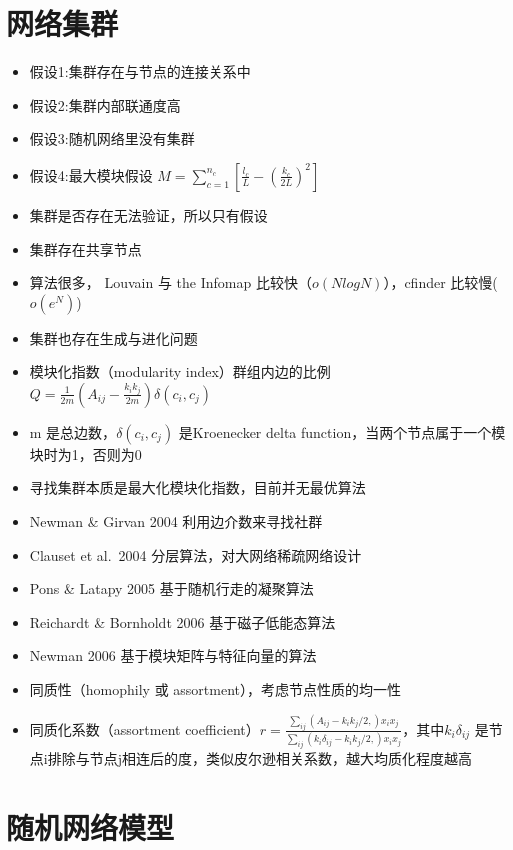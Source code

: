\documentclass[
]{book}
\providecommand{\tightlist}{%
  \setlength{\itemsep}{0pt}\setlength{\parskip}{0pt}}
\begin{document}
\hypertarget{ux7f51ux7edcux96c6ux7fa4}{%
\section{网络集群}\label{ux7f51ux7edcux96c6ux7fa4}}

\begin{itemize}
\tightlist
\item
  假设1:集群存在与节点的连接关系中
\item
  假设2:集群内部联通度高
\item
  假设3:随机网络里没有集群
\item
  假设4:最大模块假设 \(M=\sum_{c=1}^{n_c}[\frac{l_c}{L}-(\frac{k_c}{2L})^2]\)
\item
  集群是否存在无法验证，所以只有假设
\item
  集群存在共享节点
\item
  算法很多， Louvain 与 the Infomap 比较快（\(o(NlogN)\)），cfinder 比较慢(\(o(e^N)\))
\item
  集群也存在生成与进化问题
\item
  模块化指数（modularity index）群组内边的比例 \(Q = \frac{1}{2m}(A_{ij}-\frac{k_ik_j}{2m})\delta(c_i,c_j)\)
\item
  m 是总边数，\(\delta(c_i,c_j)\) 是Kroenecker delta function，当两个节点属于一个模块时为1，否则为0
\item
  寻找集群本质是最大化模块化指数，目前并无最优算法
\item
  Newman \& Girvan 2004 利用边介数来寻找社群
\item
  Clauset et al.~2004 分层算法，对大网络稀疏网络设计
\item
  Pons \& Latapy 2005 基于随机行走的凝聚算法
\item
  Reichardt \& Bornholdt 2006 基于磁子低能态算法
\item
  Newman 2006 基于模块矩阵与特征向量的算法
\item
  同质性（homophily 或 assortment），考虑节点性质的均一性
\item
  同质化系数（assortment coefficient）\(r=\frac{\sum_{ij}(A_{ij}-k_ik_j/2,)x_ix_j}{\sum_{ij}(k_i\delta_{ij}-k_ik_j/2,)x_ix_j}\)，其中\(k_i\delta_{ij}\) 是节点i排除与节点j相连后的度，类似皮尔逊相关系数，越大均质化程度越高
\end{itemize}

\hypertarget{ux968fux673aux7f51ux7edcux6a21ux578b}{%
\section{随机网络模型}\label{ux968fux673aux7f51ux7edcux6a21ux578b}}
\end{document}
